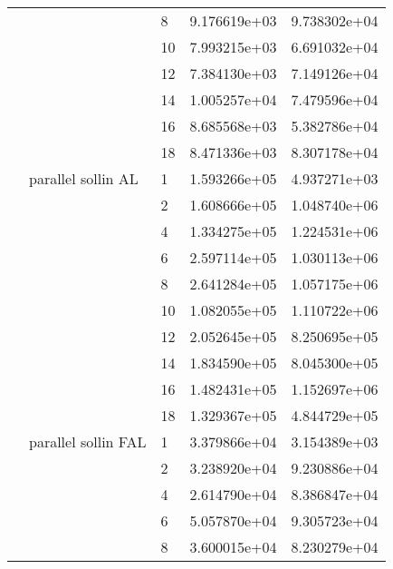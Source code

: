 \begin{tabular}{lllrr}
                      &                     & 8  &  9.176619e+03 &  9.738302e+04 \\
                      &                     & 10 &  7.993215e+03 &  6.691032e+04 \\
                      &                     & 12 &  7.384130e+03 &  7.149126e+04 \\
                      &                     & 14 &  1.005257e+04 &  7.479596e+04 \\
                      &                     & 16 &  8.685568e+03 &  5.382786e+04 \\
                      &                     & 18 &  8.471336e+03 &  8.307178e+04 \\
                      & parallel sollin AL & 1  &  1.593266e+05 &  4.937271e+03 \\
                      &                     & 2  &  1.608666e+05 &  1.048740e+06 \\
                      &                     & 4  &  1.334275e+05 &  1.224531e+06 \\
                      &                     & 6  &  2.597114e+05 &  1.030113e+06 \\
                      &                     & 8  &  2.641284e+05 &  1.057175e+06 \\
                      &                     & 10 &  1.082055e+05 &  1.110722e+06 \\
                      &                     & 12 &  2.052645e+05 &  8.250695e+05 \\
                      &                     & 14 &  1.834590e+05 &  8.045300e+05 \\
                      &                     & 16 &  1.482431e+05 &  1.152697e+06 \\
                      &                     & 18 &  1.329367e+05 &  4.844729e+05 \\
                      & parallel sollin FAL & 1  &  3.379866e+04 &  3.154389e+03 \\
                      &                     & 2  &  3.238920e+04 &  9.230886e+04 \\
                      &                     & 4  &  2.614790e+04 &  8.386847e+04 \\
                      &                     & 6  &  5.057870e+04 &  9.305723e+04 \\
                      &                     & 8  &  3.600015e+04 &  8.230279e+04 \\

\end{tabular}
